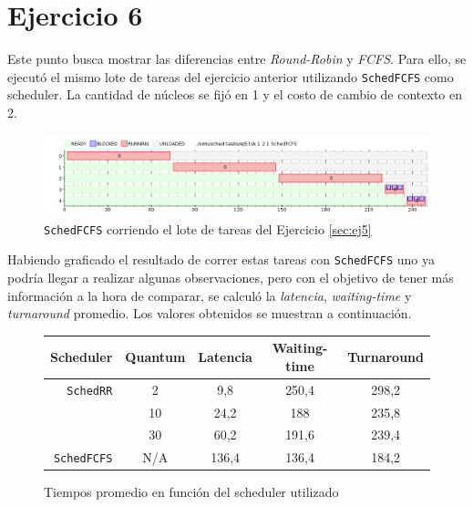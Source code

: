 \section{Ejercicio 6}

Este punto busca mostrar las diferencias entre \emph{Round-Robin} y \emph{FCFS}.
Para ello, se ejecutó el mismo lote de tareas del ejercicio anterior utilizando
\texttt{SchedFCFS} como scheduler. La cantidad de núcleos se fijó en 1 y el
costo de cambio de contexto en 2.

\begin{figure}[H]
	\begin{center}
		\includegraphics[width=1\columnwidth]{imagenes/ej6.png}
		\caption{\texttt{SchedFCFS} corriendo el lote de tareas del Ejercicio \ref{sec:ej5}}
	\end{center}
\end{figure}

Habiendo graficado el resultado de correr estas tareas con \texttt{SchedFCFS}
uno ya podría llegar a realizar algunas observaciones, pero con el objetivo de
tener más información a la hora de comparar, se calculó la
\emph{latencia}, \emph{waiting-time} y \emph{turnaround} promedio. Los valores
obtenidos se muestran a continuación.

\begin{figure}[H]
	\begin{center}
		\begin{tabular}{|r|c|c|c|c|}
			\hline
			\textbf{Scheduler} & \textbf{Quantum} & \textbf{Latencia} & \textbf{Waiting-time} & \textbf{Turnaround} \\ \hline
			\texttt{SchedRR} & 2 & 9,8 & 250,4 & 298,2 \\ \cline{2-5}
			& 10 & 24,2 & 188 & 235,8 \\ \cline{2-5}
			& 30 & 60,2 & 191,6 & 239,4 \\ \hline
			\texttt{SchedFCFS} & N/A & 136,4 & 136,4 & 184,2 \\ \hline
		\end{tabular}
		\caption{Tiempos promedio en función del scheduler utilizado}
	\end{center}
\end{figure}

